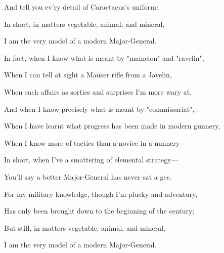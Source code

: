 \documentclass{article}
\begin{document}
    And tell you ev'ry detail of Caractacus's uniform:

    In short, in matters vegetable, animal, and mineral,

    I am the very model of a modern Major-General.
\newline

    In fact, when I know what is meant by "mamelon" and "ravelin",

    When I can tell at sight a Mauser rifle from a Javelin,

    When such affairs as sorties and surprises I'm more wary at,

    And when I know precisely what is meant by "commissariat",

    When I have learnt what progress has been made in modern gunnery,

    When I know more of tactics than a novice in a nunnery—

    In short, when I've a smattering of elemental strategy—

    You'll say a better Major-General has never sat a gee.
\newline

    For my military knowledge, though I'm plucky and adventury,

    Has only been brought down to the beginning of the century;

    But still, in matters vegetable, animal, and mineral,

    I am the very model of a modern Major-General. 
\end{document}

